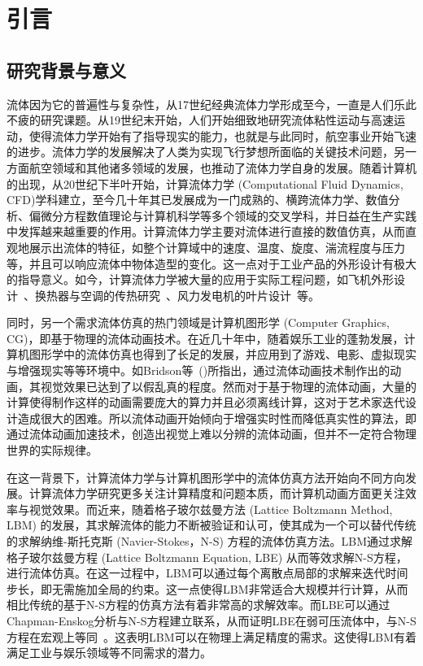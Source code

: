 \chapter{引言}

\section{研究背景与意义}
流体因为它的普遍性与复杂性，从17世纪经典流体力学形成至今，一直是人们乐此不疲的研究课题。从19世纪末开始，人们开始细致地研究流体粘性运动与高速运动，使得流体力学开始有了指导现实的能力，也就是与此同时，航空事业开始飞速的进步。流体力学的发展解决了人类为实现飞行梦想所面临的关键技术问题，另一方面航空领域和其他诸多领域的发展，也推动了流体力学自身的发展。随着计算机的出现，从20世纪下半叶开始，计算流体力学 (Computational Fluid Dynamics, CFD)学科建立，至今几十年其已发展成为一门成熟的、横跨流体力学、数值分析、偏微分方程数值理论与计算机科学等多个领域的交叉学科，并日益在生产实践中发挥越来越重要的作用。计算流体力学主要对流体进行直接的数值仿真，从而直观地展示出流体的特征，如整个计算域中的速度、温度、旋度、湍流程度与压力等，并且可以响应流体中物体造型的变化。这一点对于工业产品的外形设计有极大的指导意义。如今，计算流体力学被大量的应用于实际工程问题，如飞机外形设计~\cite{JOHNSON20051115}、换热器与空调的传热研究~\cite{ASLAMBHUTTA20121}、风力发电机的叶片设计~\cite{Shourangiz-Haghighi2020-mo}等。

同时，另一个需求流体仿真的热门领域是计算机图形学 (Computer Graphics, CG)，即基于物理的流体动画技术。在近几十年中，随着娱乐工业的蓬勃发展，计算机图形学中的流体仿真也得到了长足的发展，并应用到了游戏、电影、虚拟现实与增强现实等等环境中。如Bridson等~(\citeyear{doi:10.1126/science.1198769})所指出，通过流体动画技术制作出的动画，其视觉效果已达到了以假乱真的程度。然而对于基于物理的流体动画，大量的计算使得制作这样的动画需要庞大的算力并且必须离线计算，这对于艺术家迭代设计造成很大的困难。所以流体动画开始倾向于增强实时性而降低真实性的算法，即通过流体动画加速技术，创造出视觉上难以分辨的流体动画，但并不一定符合物理世界的实际规律。

在这一背景下，计算流体力学与计算机图形学中的流体仿真方法开始向不同方向发展。计算流体力学研究更多关注计算精度和问题本质，而计算机动画方面更关注效率与视觉效果。而近来，随着格子玻尔兹曼方法 (Lattice Boltzmann Method, LBM) 的发展，其求解流体的能力不断被验证和认可，使其成为一个可以替代传统的求解纳维-斯托克斯 (Navier-Stokes，N-S) 方程的流体仿真方法。LBM通过求解格子玻尔兹曼方程 (Lattice Boltzmann Equation, LBE) 从而等效求解N-S方程，进行流体仿真。在这一过程中，LBM可以通过每个离散点局部的求解来迭代时间步长，即无需施加全局的约束。这一点使得LBM非常适合大规模并行计算，从而相比传统的基于N-S方程的仿真方法有着非常高的求解效率。而LBE可以通过Chapman-Enskog分析与N-S方程建立联系，从而证明LBE在弱可压流体中，与N-S方程在宏观上等同~\cite{Y.H.Qian_1993}。这表明LBM可以在物理上满足精度的需求。这使得LBM有着满足工业与娱乐领域等不同需求的潜力。

